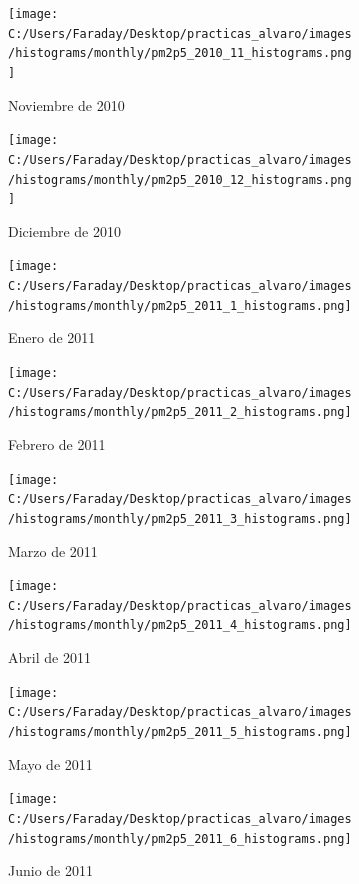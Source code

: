 \documentclass[12pt]{article}
\begin{document}
\begin{figure}[H]
\centering
\begin{subfigure}[h]{0.45\textwidth}
\texttt{[image: C:/Users/Faraday/Desktop/practicas\_alvaro/images/histograms/monthly/pm2p5\_2010\_11\_histograms.png]}
\caption{Noviembre de 2010}
\label{fig:hist-mon-4-11-2010}
\end{subfigure}
%
\begin{subfigure}[H]{0.45\textwidth}
\texttt{[image: C:/Users/Faraday/Desktop/practicas\_alvaro/images/histograms/monthly/pm2p5\_2010\_12\_histograms.png]}
\caption{Diciembre de 2010}
\label{fig:hist-mon-4-12-2010}
\end{subfigure}
\caption{}
\end{figure}

\newpage

\begin{figure}[H]
\centering
\begin{subfigure}[h]{0.45\textwidth}
\texttt{[image: C:/Users/Faraday/Desktop/practicas\_alvaro/images/histograms/monthly/pm2p5\_2011\_1\_histograms.png]}
\caption{Enero de 2011}
\label{fig:hist-mon-4-1-2011}
\end{subfigure}
%
\begin{subfigure}[H]{0.45\textwidth}
\texttt{[image: C:/Users/Faraday/Desktop/practicas\_alvaro/images/histograms/monthly/pm2p5\_2011\_2\_histograms.png]}
\caption{Febrero de 2011}
\label{fig:hist-mon-4-2-2011}
\end{subfigure}
\caption{}
\end{figure}

\begin{figure}[H]
\centering
\begin{subfigure}[h]{0.45\textwidth}
\texttt{[image: C:/Users/Faraday/Desktop/practicas\_alvaro/images/histograms/monthly/pm2p5\_2011\_3\_histograms.png]}
\caption{Marzo de 2011}
\label{fig:hist-mon-4-3-2011}
\end{subfigure}
%
\begin{subfigure}[H]{0.45\textwidth}
\texttt{[image: C:/Users/Faraday/Desktop/practicas\_alvaro/images/histograms/monthly/pm2p5\_2011\_4\_histograms.png]}
\caption{Abril de 2011}
\label{fig:hist-mon-4-4-2011}
\end{subfigure}
\caption{}
\end{figure}

\begin{figure}[H]
\centering
\begin{subfigure}[h]{0.45\textwidth}
\texttt{[image: C:/Users/Faraday/Desktop/practicas\_alvaro/images/histograms/monthly/pm2p5\_2011\_5\_histograms.png]}
\caption{Mayo de 2011}
\label{fig:hist-mon-4-5-2011}
\end{subfigure}
%
\begin{subfigure}[H]{0.45\textwidth}
\texttt{[image: C:/Users/Faraday/Desktop/practicas\_alvaro/images/histograms/monthly/pm2p5\_2011\_6\_histograms.png]}
\caption{Junio de 2011}
\label{fig:hist-mon-4-6-2011}
\end{subfigure}
\caption{}
\end{figure}
\end{document}
